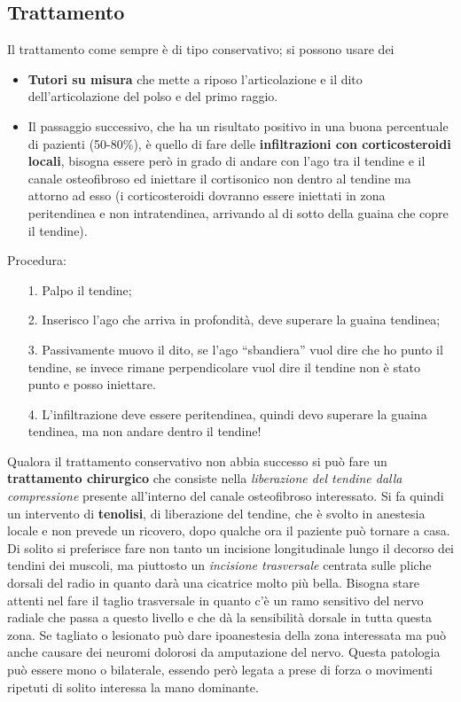 \subsection{Trattamento}

Il trattamento come sempre è di tipo conservativo; si possono usare dei

\begin{itemize}
\item
  \textbf{Tutori su misura} che mette a riposo l'articolazione e il dito dell'articolazione del polso e del primo raggio.
\item
  Il passaggio successivo, che ha un risultato positivo in una buona percentuale di pazienti (50-80\%), è quello di fare delle \textbf{infiltrazioni con corticosteroidi locali}, bisogna essere però in grado di andare con l'ago tra il tendine e il canale osteofibroso ed iniettare il cortisonico non dentro al tendine ma attorno ad esso (i corticosteroidi dovranno essere iniettati in zona peritendinea e non intratendinea, arrivando al di sotto della guaina che copre il tendine).
\end{itemize}

Procedura:
\begin{itemize}
\item[1.] Palpo il tendine;
\item[2.] Inserisco l'ago che arriva in profondità, deve superare la guaina tendinea;
\item[3.] Passivamente muovo il dito, se l'ago ``sbandiera'' vuol dire che ho punto il tendine, se invece rimane perpendicolare vuol dire il tendine
non è stato punto e posso iniettare.
\item[4.] L'infiltrazione deve essere peritendinea, quindi devo superare la guaina tendinea, ma non andare dentro il tendine!
\end{itemize}

Qualora il trattamento conservativo non abbia successo si può fare  un \textbf{trattamento chirurgico} che consiste nella \emph{liberazione del tendine dalla compressione} presente all'interno del canale osteofibroso interessato. Si fa quindi un intervento di \textbf{tenolisi}, di liberazione del tendine, che è svolto in anestesia locale e non prevede un ricovero, dopo qualche ora il paziente può tornare a casa. Di solito si preferisce fare non tanto un incisione longitudinale lungo il decorso dei tendini dei muscoli, ma piuttosto un \emph{incisione trasversale} centrata sulle pliche dorsali del radio in quanto darà una cicatrice molto più bella. Bisogna stare attenti nel fare il taglio trasversale in quanto c'è un ramo sensitivo del nervo radiale che passa a questo livello e che dà la sensibilità dorsale in tutta questa zona. Se tagliato o lesionato può dare ipoanestesia della zona interessata ma può anche causare dei neuromi dolorosi da amputazione del nervo. Questa patologia può essere mono o bilaterale, essendo però legata a prese di forza o movimenti ripetuti di solito interessa la mano dominante.


